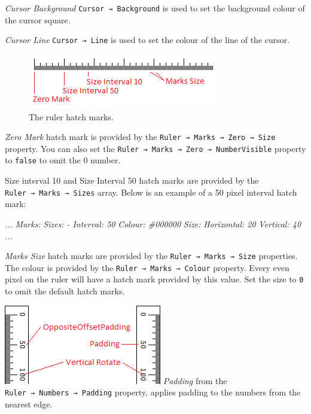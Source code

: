 \documentclass[
]{book}
\newenvironment{Shaded}{\begin{snugshade}}{\end{snugshade}}
\newcommand{\CommentTok}[1]{\textcolor[rgb]{0.56,0.35,0.01}{\textit{#1}}}
\begin{document}
\emph{Cursor Background} \texttt{Cursor\ →\ Background} is used to set the background colour of the cursor square.

\emph{Cursor Line} \texttt{Cursor\ →\ Line} is used to set the colour of the line of the cursor.

\begin{figure}
\centering
\includegraphics{images/ruler-hashmarks.png}
\caption{\label{fig:unnamed-chunk-10}The ruler hatch marks.}
\end{figure}

\emph{Zero Mark} hatch mark is provided by the \texttt{Ruler\ →\ Marks\ →\ Zero\ →\ Size} property.
You can also set the \texttt{Ruler\ →\ Marks\ →\ Zero\ →\ NumberVisible} property to \texttt{false} to omit the 0 number.

Size interval 10 and Size Interval 50 hatch marks are provided by the \texttt{Ruler\ →\ Marks\ →\ Sizes} array.
Below is an example of a 50 pixel interval hatch mark:

\begin{Shaded}
\begin{Highlighting}[]
\CommentTok{...}
\CommentTok{  Marks:}
\CommentTok{    Sizes:}
\CommentTok{      {-} Interval: 50}
\CommentTok{        Colour: \#000000}
\CommentTok{        Size:}
\CommentTok{          Horizontal: 20}
\CommentTok{          Vertical: 40}
\CommentTok{...}
\end{Highlighting}
\end{Shaded}

\emph{Marks Size} hatch marks are provided by the \texttt{Ruler\ →\ Marks\ →\ Size} properties.
The colour is provided by the \texttt{Ruler\ →\ Marks\ →\ Colour} property.
Every even pixel on the ruler will have a hatch mark provided by this value.
Set the size to \texttt{0} to omit the default hatch marks.

\includegraphics{images/ruler-vertical.png}
\emph{Padding} from the \texttt{Ruler\ →\ Numbers\ →\ Padding} property, applies padding to the numbers from the nearest edge.
\end{document}
